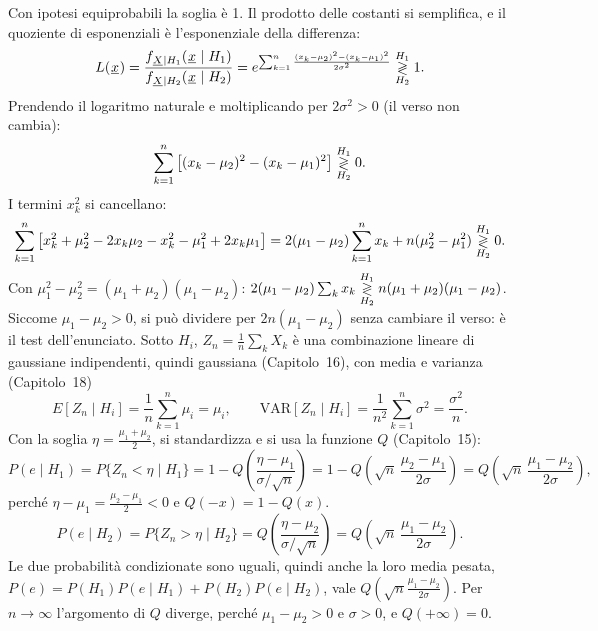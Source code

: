 
\begin{dimostrazione}
 Con ipotesi equiprobabili la soglia è 1. Il prodotto delle costanti si
semplifica, e il quoziente di esponenziali è l'esponenziale della differenza:
\[ L(\vett{x}) = \frac{f_{\vett{X} \mid H_1}(\vett{x} \mid H_1)}{f_{\vett{X} \mid H_2}(\vett{x} \mid H_2)} =
   e^{\sum_{k=1}^{n} \frac{(x_k - \mu_2)^2 - (x_k - \mu_1)^2}{2\sigma^2}} \decidi{H_1}{H_2} 1 . \]
 Prendendo il logaritmo naturale e moltiplicando per $2\sigma^2 > 0$ (il verso non cambia):
\[ \sum_{k=1}^{n} \left[ (x_k - \mu_2)^2 - (x_k - \mu_1)^2 \right] \decidi{H_1}{H_2} 0 . \]
 I termini $x_k^2$ si cancellano:
\[ \sum_{k=1}^{n} \left[ x_k^2 + \mu_2^2 - 2 x_k \mu_2 - x_k^2 - \mu_1^2 + 2 x_k \mu_1 \right] = 2(\mu_1 - \mu_2)
   \sum_{k=1}^{n} x_k + n(\mu_2^2 - \mu_1^2) \decidi{H_1}{H_2} 0 . \]
 Con $\mu_1^2 - \mu_2^2 = (\mu_1 + \mu_2)(\mu_1 - \mu_2)$:
$2(\mu_1 - \mu_2) \sum_k x_k \decidi{H_1}{H_2} n (\mu_1 + \mu_2)(\mu_1 - \mu_2)$. Siccome $\mu_1 - \mu_2 > 0$, si può
dividere per $2n(\mu_1 - \mu_2)$ senza cambiare il verso: è il test dell'enunciato.
 Sotto $H_i$, $Z_n = \frac{1}{n}\sum_k X_k$ è una combinazione lineare di gaussiane
indipendenti, quindi gaussiana (Capitolo~16), con media e varianza (Capitolo~18)
\[ E[Z_n \mid H_i] = \frac{1}{n} \sum_{k=1}^{n} \mu_i = \mu_i , \qquad \mathrm{VAR}[Z_n \mid H_i] = \frac{1}{n^2}
   \sum_{k=1}^{n} \sigma^2 = \frac{\sigma^2}{n} . \]
 Con la soglia $\eta = \frac{\mu_1 + \mu_2}{2}$, si standardizza e si usa la funzione $Q$
(Capitolo~15):
\[ P(e \mid H_1) = P\{Z_n < \eta \mid H_1\} = 1 - Q\left( \frac{\eta - \mu_1}{\sigma / \sqrt{n}} \right) = 1 - Q\left(
   \sqrt{n}\, \frac{\mu_2 - \mu_1}{2\sigma} \right) = Q\left( \sqrt{n}\, \frac{\mu_1 - \mu_2}{2\sigma} \right) , \]
perché $\eta - \mu_1 = \frac{\mu_2 - \mu_1}{2} < 0$ e $Q(-x) = 1 - Q(x)$.
\[ P(e \mid H_2) = P\{Z_n > \eta \mid H_2\} = Q\left( \frac{\eta - \mu_2}{\sigma / \sqrt{n}} \right) = Q\left( \sqrt{n}\,
   \frac{\mu_1 - \mu_2}{2\sigma} \right) . \]
 Le due probabilità condizionate sono uguali, quindi anche la loro media pesata, $P(e) =
P(H_1) P(e \mid H_1) + P(H_2) P(e \mid H_2)$, vale $Q\left( \sqrt{n} \frac{\mu_1 - \mu_2}{2\sigma} \right)$. Per $n \to
\infty$ l'argomento di $Q$ diverge, perché $\mu_1 - \mu_2 > 0$ e $\sigma > 0$, e $Q(+\infty) = 0$.
\end{dimostrazione}

